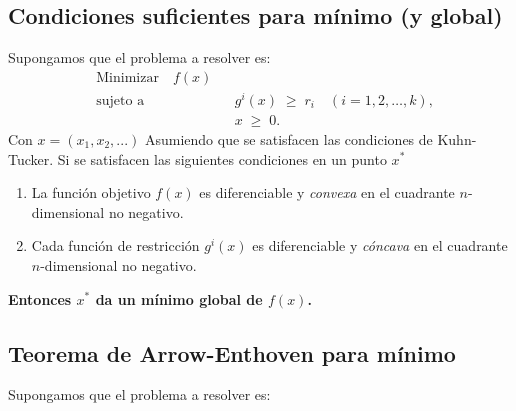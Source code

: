 \documentclass{article}
\begin{document}
\subsection*{Condiciones suficientes para mínimo (y global)}
Supongamos que el problema a resolver es:
\[
\begin{aligned}
&\text{Minimizar} \quad  f(x) \\
&\text{sujeto a} \quad && g^{i}(x) \;\ge\; r_{i}
\quad (i = 1,2,\dots,k),\\
& && x \;\ge\; 0.
\end{aligned}
\]
Con $x=(x_1,x_2,...)$
Asumiendo que se satisfacen las condiciones de Kuhn-Tucker.
Si se satisfacen las siguientes condiciones en un punto $x^*$
\begin{enumerate}\color{teal}
  \item La función objetivo \(f(x)\) es diferenciable y \emph{convexa} en el cuadrante \(n\)-dimensional no negativo.
  \item Cada función de restricción \(g^{i}(x)\) es diferenciable y \emph{cóncava} en el cuadrante \(n\)-dimensional no negativo.
\end{enumerate}
\textbf{\color{teal}Entonces \(x^{*}\) da un mínimo global de \(f(x)\).}


\subsection*{Teorema de Arrow-Enthoven para mínimo}
Supongamos que el problema a resolver es:
\end{document}
